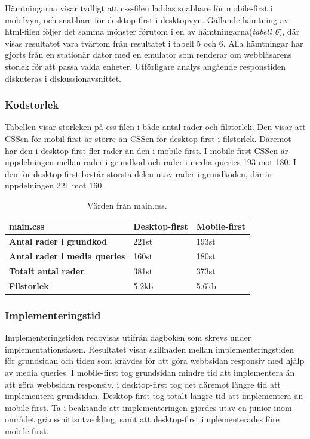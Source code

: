 \documentclass[11pt]{article}
\begin{document}
Hämtningarna visar tydligt att css-filen laddas snabbare för mobile-first i mobilvyn, och snabbare för desktop-first i desktopvyn. Gällande hämtning av html-filen följer det samma mönster förutom i en av hämtningarna(\textit{tabell 6}), där visas resultatet vara tvärtom från resultatet i tabell 5 och 6. Alla hämtningar har gjorts från en stationär dator med en emulator som renderar om webbläsarens storlek för att passa valda enheter. Utförligare analys angående responstiden diskuteras i diskussionavsnittet.

\subsubsection{Kodstorlek}

Tabellen visar storleken på css-filen i både antal rader och filstorlek. Den visar att CSSen för mobil-first är större än CSSen för desktop-first i filstorlek. Däremot har den i desktop-first fler rader än den i mobile-first. I mobile-first CSSen är uppdelningen mellan rader i grundkod och rader i media queries 193 mot 180. I den för desktop-first består största delen utav rader i grundkoden, där är uppdelningen 221 mot 160.

\begin{table}[H]
	\centering
	\begin{tabular}{|p{6cm}|p{2.7cm}|p{2.4cm}|}
	\hline
	\textbf{main.css}&\textbf{Desktop-first}&\textbf{Mobile-first}\\ \hline
	\textbf{Antal rader i grundkod}&221st&193st\\ \hline
	\textbf{Antal rader i media queries}&160st&180st\\ \hline
	\textbf{Totalt antal rader}&381st&373st\\ \hline
	\textbf{Filstorlek}&5.2kb&5.6kb\\ \hline
	\end{tabular}
    \caption {Värden från main.css.}
\end{table}

\subsubsection{Implementeringstid}

Implementeringstiden redovisas utifrån dagboken som skrevs under implementationsfasen. Resultatet visar skillnaden mellan implementeringstiden för grundsidan och tiden som krävdes för att göra webbsidan responsiv med hjälp av media queries. I mobile-first tog grundsidan mindre tid att implementera än att göra webbsidan responsiv, i desktop-first tog det däremot längre tid att implementera grundsidan. Desktop-first tog totalt längre tid att implementera än mobile-first. Ta i beaktande att implementeringen gjordes utav en junior inom området gränssnittsutveckling, samt att desktop-first implementerades före mobile-first.
\end{document}
